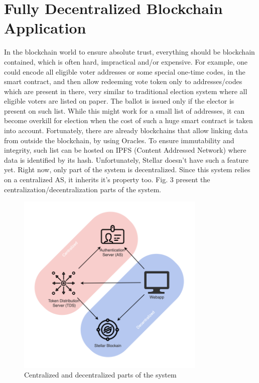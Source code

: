 \documentclass[runningheads]{llncs}
\begin{document}
\section{Fully Decentralized Blockchain Application}
In the blockchain world to ensure absolute trust, everything should be blockchain contained, which is often hard, impractical and/or expensive. For example, one could encode all eligible voter addresses or some special one-time codes, in the smart contract, and then allow redeeming vote token only to addresses/codes which are present in there, very similar to traditional election system where all eligible voters are listed on paper. The ballot is issued only if the elector is present on such list. While this might work for a small list of addresses, it can become overkill for election when the cost of such a huge smart contract is taken into account. Fortunately, there are already blockchains that allow linking data from outside the blockchain, by using Oracles. To ensure immutability and integrity, such list can be hosted on IPFS (Content Addressed Network) where data is identified by its hash. Unfortunately, Stellar doesn't have such a feature yet. Right now, only part of the system is decentralized. Since this system relies on a centralized AS, it inherits it's property too. Fig. 3 present the centralization/decentralization parts of the system.

\begin{figure}
\includegraphics[width=9cm]{stellot-decentralization.png}
\centering
\caption{Centralized and decentralized parts of the system}
\label{fig:decentralization}
\end{figure} 


\end{document}
